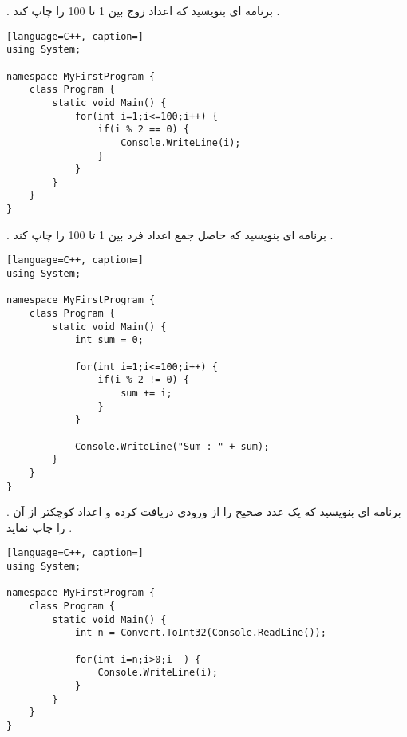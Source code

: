 \documentclass[12pt]{article}
\begin{document}
\newpage

 . برنامه ای بنویسید که اعداد زوج بین 1 تا 100 را چاپ کند .





\begin{latin}
\begin{lstlisting}[language=C++, caption=]
using System;

namespace MyFirstProgram {
	class Program {
		static void Main() {
			for(int i=1;i<=100;i++) {
				if(i % 2 == 0) {
					Console.WriteLine(i);
				}
			}
		}
	}
}
\end{lstlisting}
\end{latin}








 . برنامه ای بنویسید که حاصل جمع اعداد فرد بین 1 تا 100 را چاپ کند .






\begin{latin}
\begin{lstlisting}[language=C++, caption=]
using System;

namespace MyFirstProgram {
	class Program {
		static void Main() {
			int sum = 0;
			
			for(int i=1;i<=100;i++) {
				if(i % 2 != 0) {
					sum += i;
				}
			}

			Console.WriteLine("Sum : " + sum);
		}
	}
}
\end{lstlisting}
\end{latin}






 . برنامه ای بنویسید که یک عدد صحیح را از ورودی دریافت کرده و اعداد کوچکتر از آن را چاپ نماید .







\begin{latin}
\begin{lstlisting}[language=C++, caption=]
using System;

namespace MyFirstProgram {
	class Program {
		static void Main() {
			int n = Convert.ToInt32(Console.ReadLine());
			
			for(int i=n;i>0;i--) {
				Console.WriteLine(i);
			}
		}
	}
}
\end{lstlisting}
\end{latin}
\end{document}
